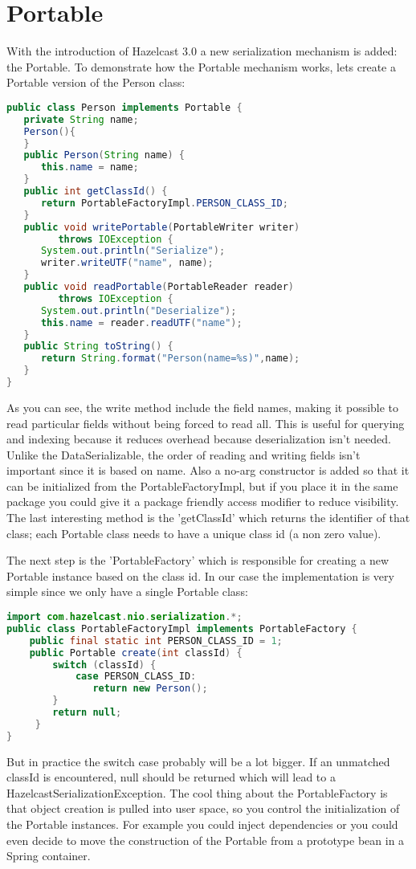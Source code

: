 \section{Portable}
With the introduction of Hazelcast 3.0 a new serialization mechanism is added: the Portable. To demonstrate how the Portable mechanism works, lets create a Portable version of the Person class:
\begin{lstlisting}[language=java]
public class Person implements Portable {
   private String name;
   Person(){
   }
   public Person(String name) {
      this.name = name;
   }
   public int getClassId() {
      return PortableFactoryImpl.PERSON_CLASS_ID;
   }
   public void writePortable(PortableWriter writer) 
         throws IOException {
      System.out.println("Serialize");
      writer.writeUTF("name", name);
   }
   public void readPortable(PortableReader reader) 
         throws IOException {
      System.out.println("Deserialize");
      this.name = reader.readUTF("name");
   }
   public String toString() {
      return String.format("Person(name=%s)",name);
   }
}
\end{lstlisting}
As you can see, the write method include the field names, making it possible to read particular fields without being forced to read all. This is useful for querying and indexing because it reduces overhead because deserialization isn't needed. Unlike the DataSerializable, the order of reading and writing fields isn't important since it is based on name. Also a no-arg constructor is added so that it can be initialized from the PortableFactoryImpl, but if you place it in the same package you could give it a package friendly access modifier to reduce visibility. The last interesting method is the 'getClassId' which returns the identifier of that class; each Portable class needs to have a unique class id (a non zero value).

The next step is the 'PortableFactory' which is responsible for creating a new Portable instance based on the class id. In our case the implementation is very simple since we only have a single Portable class:
\begin{lstlisting}[language=java]
import com.hazelcast.nio.serialization.*;
public class PortableFactoryImpl implements PortableFactory {
    public final static int PERSON_CLASS_ID = 1;
    public Portable create(int classId) {
        switch (classId) {
            case PERSON_CLASS_ID: 
               return new Person();
        }
        return null;
     }
}
\end{lstlisting}
But in practice the switch case probably will be a lot bigger. If an unmatched classId is encountered, null should be returned which will lead to a HazelcastSerializationException. The cool thing about the PortableFactory is that object creation is pulled into user space, so you control the initialization of the Portable instances. For example you could inject dependencies or you could even decide to move the construction of the Portable from a prototype bean in a Spring container. 

